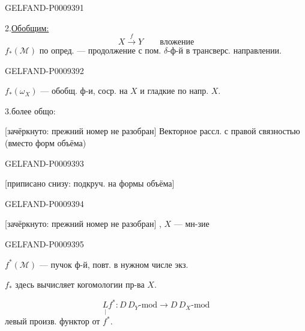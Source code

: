 \begin{GelfandAdjacentEvidence}{GELFAND-P000939}{1}

2.\enspace \underline{Обобщим:}
\[
 X\overset f\longrightarrow Y\qquad\text{вложение}
\]
$f_*(\mathcal M)$ по опред. --- продолжение с пом. $\delta$-ф-й в трансверс. направлении.
\end{GelfandAdjacentEvidence}
\begin{GelfandAdjacentEvidence}{GELFAND-P000939}{2}


$f_*(\omega_X)$ --- обобщ. ф-и, соср. на $X$ и гладкие по напр. $X$.

3.\enspace более общо:

[зачёркнуто: прежний номер не разобран] Векторное рассл. с правой связностью (вместо форм объёма)
\end{GelfandAdjacentEvidence}
\begin{GelfandAdjacentEvidence}{GELFAND-P000939}{3}


[приписано снизу: подкруч. на формы объёма]
\end{GelfandAdjacentEvidence}
\begin{GelfandAdjacentEvidence}{GELFAND-P000939}{4}



[зачёркнуто: прежний номер не разобран] , $X$ --- мн-зие
\end{GelfandAdjacentEvidence}
\begin{GelfandAdjacentEvidence}{GELFAND-P000939}{5}


$f^*(\mathcal M)$ --- пучок ф-й, повт. в нужном числе экз.

$f_*$ здесь вычисляет когомологии пр-ва $X$.

\begin{equation*}
 \underset{\vert}{L} f^*:D\,D_Y\text{-mod}\longrightarrow D\,D_X\text{-mod}
 \tag{11}
\end{equation*}
левый произв. функтор от $f^*$.
\end{GelfandAdjacentEvidence}
